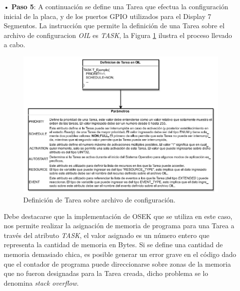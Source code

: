 \documentclass[12pt,letterpaper]{article}
\begin{document}
\begin{enumerate}
\item[•]\textbf{Paso 5}: A continuación se define una Tarea que efectua la configuración inicial de la placa, y de los puertos GPIO utilizados para el Display 7 Segmentos. La instrucción que permite la definición de una Tarea sobre el archivo de configuracion \textit{OIL} es \textit{TASK}, la Figura \ref{Fig38} ilustra el proceso llevado a cabo.
\begin{figure}[H]
\centering
\includegraphics[width=15 cm]{figuras/f21.png}
\caption{Definición de Tarea sobre archivo de configuración.}
\label{Fig38}
\end{figure}
Debe destacarse que la implementación de OSEK que se utiliza en este caso, nos permite realizar la asignación de memoria de programa para una Tarea a través del atributo \textit{TASK}, el valor asignado es un número entero que representa la cantidad de memoria en Bytes. Si se define una cantidad de memoria demasiado chica, es posible generar un error grave en el código dado que el contador de programa puede direccionarse sobre zonas de la memoria que no fueron designadas para la Tarea creada, dicho problema se lo denomina \textit{stack overflow}.


\end{enumerate}
\end{document}
